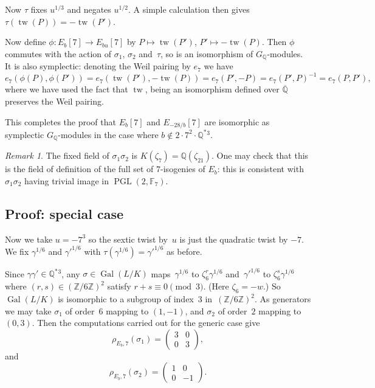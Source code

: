 \documentclass[12pt]{amsart}
\newcommand{\F}{\mathbb{F}}
\newcommand{\Q}{\mathbb{Q}}
\newcommand{\Z}{\mathbb{Z}}
\DeclareMathOperator{\Gal}{Gal}
\DeclareMathOperator{\tw}{tw}
\newcommand{\PGL}{\operatorname{PGL}}
\numberwithin{equation}{section}
\theoremstyle{definition}
\theoremstyle{remark}
\newtheorem{remark}[theorem]{Remark}
\begin{document}
Now $\tau$ fixes $u^{1/3}$ and negates $u^{1/2}$. A simple calculation
then gives $\tau(\tw(P)) = -\tw(P')$.

Now define $\phi: E_b[7] \to E_{bu}[7]$ by $P\mapsto\tw(P')$,
$P'\mapsto-\tw(P)$.  Then $\phi$ commutes with the action of
$\sigma_1$, $\sigma_2$ and~$\tau$, so is an isomorphism of
$G_\Q$-modules.  It is also symplectic:  denoting the Weil pairing by
$e_7$ we have
\[
e_7(\phi(P),\phi(P')) = e_7(\tw(P'),-\tw(P)) = e_7(P',-P) =
e_7(P',P)^{-1} = e_7(P,P'),
\]
where we have used the fact that $\tw$, being an isomorphism defined
over $\overline{\Q}$ preserves the Weil pairing.

This completes the proof that $E_b[7]$ and $E_{-28/b}[7]$ are
isomorphic as symplectic $G_{\Q}$-modules in the case where $b\notin
2\cdot7^2\cdot \Q^*{}^3$.


\begin{remark}
The fixed field of $\sigma_1\sigma_2$ is $K(\zeta_7)=\Q(\zeta_{21})$.
One may check that this is the field of definition of the full set of
$7$-isogenies of $E_b$: this is consistent with $\sigma_1\sigma_2$
having trivial image in $\PGL(2,\F_7)$.
\end{remark}

\subsection{Proof: special case}

Now we take $u=-7^3$ so the sextic twist by~$u$ is just the quadratic
twist by $-7$.  We fix $\gamma^{1/6}$ and $\gamma'^{1/6}$ with
$\tau(\gamma^{1/6})=\gamma'^{1/6}$ as before.

Since $\gamma\gamma'\in\Q^*{}^3$, any $\sigma\in\Gal(L/K)$
maps~$\gamma^{1/6}$ to $\zeta_6^r\gamma^{1/6}$ and~$\gamma'^{1/6}$ to
$\zeta_6^s\gamma^{1/6}$ where $(r,s)\in(\Z/6\Z)^2$ satisfy
$r+s\equiv0\pmod3$.  (Here $\zeta_6=-w$.) So $\Gal(L/K)$ is isomorphic
to a subgroup of index~$3$ in~$(\Z/6\Z)^2$.  As generators we may take
$\sigma_1$ of order~$6$ mapping to $(1,-1)$, and $\sigma_2$ of
order~$2$ mapping to $(0,3)$.  Then the computations carried out for
the generic case give
\[
   \rho_{E_b,7}(\sigma_1) = \begin{pmatrix}3&0\\0&3   \end{pmatrix},
\]
and
\[
   \rho_{E_b,7}(\sigma_2) = \begin{pmatrix}1&0\\0&-1   \end{pmatrix}.
\]
\end{document}
